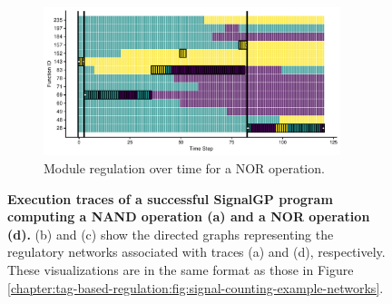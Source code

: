 \begin{figure}
\begin{subfigure}[b]{0.95\textwidth}
    \centering
    \includegraphics[width=0.95\textwidth]{chapters/05-tag-based-genetic-regulation/media/boolean-calc-prefix-networks/case-study-trace-id-24400-test_id-134-regulator-state-horizontal-nolegend.pdf}
    \caption{\small Module regulation over time for a NOR operation.}
    \label{chapter:tag-based-regulation:subfig:bc-nor-exec-trace}
\end{subfigure}%

\caption{\small 
\textbf{Execution traces of a successful SignalGP program computing a NAND operation (a) and a NOR operation (d).}
(b) and (c) show the directed graphs representing the regulatory networks associated with traces (a) and (d), respectively.
These visualizations are in the same format as those in Figure \ref{chapter:tag-based-regulation:fig:signal-counting-example-networks}.}
\label{chapter:tag-based-regulation:fig:boolean-calc-prefix-example-networks}
\end{figure}
